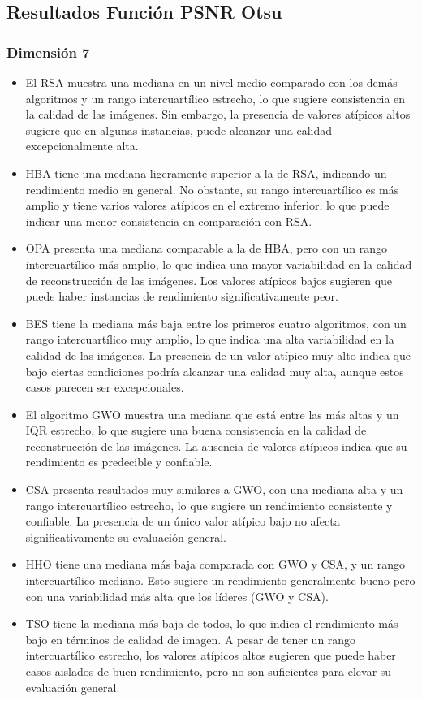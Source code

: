 \documentclass[conference]{IEEEtran}
\begin{document}
\subsection{Resultados Función PSNR Otsu}
\subsubsection{Dimensión 7}
\begin{itemize}
\item El RSA muestra una mediana en un nivel medio comparado con los demás algoritmos y un rango intercuartílico estrecho, lo que sugiere consistencia en la calidad de las imágenes.
Sin embargo, la presencia de valores atípicos altos sugiere que en algunas instancias, puede alcanzar una calidad excepcionalmente alta.

\item HBA tiene una mediana ligeramente superior a la de RSA, indicando un rendimiento medio en general. No obstante, su rango intercuartílico es más amplio y tiene varios valores atípicos en el extremo inferior, lo que puede indicar una menor consistencia en comparación con RSA.
\item OPA presenta una mediana comparable a la de HBA, pero con un rango intercuartílico más amplio, lo que indica una mayor variabilidad en la calidad de reconstrucción de las imágenes. Los valores atípicos bajos sugieren que puede haber instancias de rendimiento significativamente peor.

\item BES tiene la mediana más baja entre los primeros cuatro algoritmos, con un rango intercuartílico muy amplio, lo que indica una alta variabilidad en la calidad de las imágenes. La presencia de un valor atípico muy alto indica que bajo ciertas condiciones podría alcanzar una calidad muy alta, aunque estos casos parecen ser excepcionales.

\item El algoritmo GWO muestra una mediana que está entre las más altas y un IQR estrecho, lo que sugiere una buena consistencia en la calidad de reconstrucción de las imágenes. La ausencia de valores atípicos indica que su rendimiento es predecible y confiable.

\item CSA presenta resultados muy similares a GWO, con una mediana alta y un rango intercuartílico estrecho, lo que sugiere un rendimiento consistente y confiable. La presencia de un único valor atípico bajo no afecta significativamente su evaluación general.

\item HHO tiene una mediana más baja comparada con GWO y CSA, y un rango intercuartílico mediano. Esto sugiere un rendimiento generalmente bueno pero con una variabilidad más alta que los líderes (GWO y CSA).
\item TSO tiene la mediana más baja de todos, lo que indica el rendimiento más bajo en términos de calidad de imagen. A pesar de tener un rango intercuartílico estrecho, los valores atípicos altos sugieren que puede haber casos aislados de buen rendimiento, pero no son suficientes para elevar su evaluación general.
\end{itemize}
\end{document}
